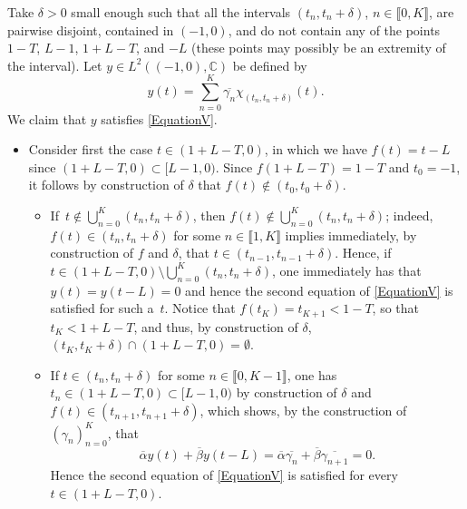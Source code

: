 Take $\delta > 0$ small enough such that all the intervals $(t_n, t_n + \delta)$, $n \in \llbracket 0, K\rrbracket$, are pairwise disjoint, contained in $(-1, 0)$, and do not contain any of the points $1 - T$, $L - 1$, $1 + L - T$, and $-L$ (these points may possibly be an extremity of the interval). Let $y \in L^2((-1, 0), \mathbb C)$ be defined by
\begin{equation}
\label{DefV}
y(t) = \sum_{n=0}^K \overline{\gamma_n} \chi_{(t_n, t_n + \delta)}(t).
\end{equation}
We claim that $y$ satisfies \eqref{EquationV}.
\begin{itemize}
\item
Consider first the case $t \in (1 + L - T, 0)$, in which we have $f(t) = t - L$ since $(1 + L - T, 0) \subset [L - 1, 0)$. Since $f(1 + L - T) = 1 - T$ and $t_0 = -1$, it follows by construction of $\delta$ that $f(t) \notin (t_0, t_0 + \delta)$.
\begin{itemize}
\item
If~\hbox{$t \!\notin\! \bigcup_{n=0}^K (t_n, t_n + \delta)$}, then $f(t) \!\notin\! \bigcup_{n=0}^K (t_n, t_n + \delta)$; indeed, $f(t) \!\in\! (t_n, t_n + \delta)$ for some $n \in \llbracket 1, K\rrbracket$ implies immediately, by construction of $f$ and $\delta$, that \hbox{$t \in (t_{n-1}, t_{n-1} + \delta)$}. Hence, if \hbox{$t \in (1 + L - T, 0) \setminus \bigcup_{n=0}^K (t_n, t_n + \delta)$}, one immediately has that \hbox{$y(t) = y(t - L) = 0$} and hence the second equation of \eqref{EquationV} is satisfied for such a~$t$. Notice that $f(t_K) = t_{K+1} < 1 - T$, so that $t_K < 1 + L - T$, and thus, by construction of $\delta$, \hbox{$(t_K, t_K + \delta) \cap (1 + L - T, 0) = \emptyset$}.
\item
If $t \in (t_n, t_n + \delta)$ for some $n \in \llbracket 0, K - 1\rrbracket$, one has $t_n \in (1 + L - T, 0) \subset [L - 1, 0)$ by construction of $\delta$ and $f(t) \in (t_{n+1}, t_{n+1} + \delta)$, which shows, by the construction of $(\gamma_n)_{n=0}^K$, that
\[
\overline\alpha y(t) + \overline\beta y(t - L) = \overline\alpha \overline{\gamma_n} + \overline\beta \overline{\gamma_{n+1}} = 0.
\]
Hence the second equation of \eqref{EquationV} is satisfied for every $t \in (1 + L - T, 0)$.
\end{itemize}


\end{itemize}
